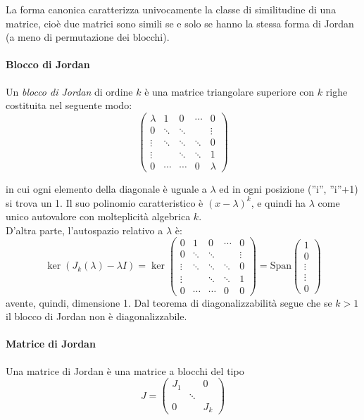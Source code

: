 La forma canonica caratterizza univocamente la classe di similitudine
di una matrice, cio\`e due matrici sono simili se e solo se hanno la
stessa forma di Jordan (a meno di permutazione dei blocchi).\\

\paragraph{Blocco di Jordan}
Un \emph{blocco di Jordan} di ordine $k$ \`e una matrice triangolare
superiore con $k$ righe costituita nel seguente modo:
$$
\begin{pmatrix}
 \lambda & 1      & 0      & \cdots & 0      \\                       
 0       & \ddots & \ddots &        & \vdots \\
 \vdots  & \ddots & \ddots & \ddots & 0      \\
 \vdots  &        & \ddots & \ddots & 1      \\
 0       & \cdots & \cdots & 0      & \lambda    
\end{pmatrix}
$$

in cui ogni elemento della diagonale \`e uguale a $\lambda$ ed in ogni
posizione (''i'', ''i''+1) si trova un 1. Il suo polinomio
caratteristico \`e $ (x-\lambda)^k $, e quindi ha $\lambda$ come unico
autovalore con molteplicit\`a algebrica $k$.      \\
D'altra parte, l'autospazio relativo a $\lambda$ \`e:
$$ \ker(J_k(\lambda) - \lambda I) = \ker\begin{pmatrix}
 0      & 1      & 0      & \cdots & 0          \\                       
 0      & \ddots & \ddots &        & \vdots     \\
 \vdots & \ddots & \ddots & \ddots & 0          \\
 \vdots &        & \ddots & \ddots & 1          \\
 0      & \cdots & \cdots & 0      & 0    
\end{pmatrix} = \textrm{Span} \begin{pmatrix} 1 \\ 0 \\ \vdots \\ \vdots \\ 0 \end{pmatrix} $$
avente, quindi, dimensione 1. Dal teorema di diagonalizzabilit\`a segue che se 
$k>1$ il blocco di Jordan non \`e diagonalizzabile.

\paragraph{Matrice di Jordan}
Una matrice di Jordan \`e una matrice a blocchi del tipo
\[ J = 
\begin{pmatrix} 
  J_1 &        & 0 \\ 
      & \ddots &   \\ 
  0   &        & J_k 
\end{pmatrix} 
\]

